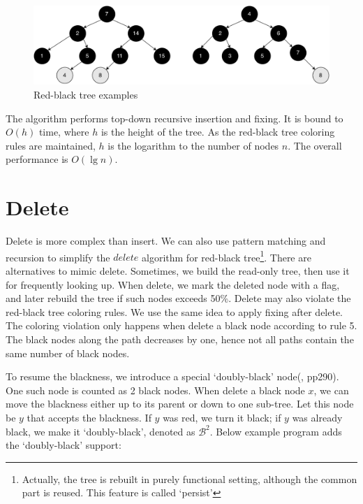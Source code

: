 \documentclass[b5paper]{article}
\begin{document}
\begin{figure}[htbp]
  \centering
  \includegraphics[scale=0.35]{img/insert-haskell}
  \caption{Red-black tree examples}
  \label{fig:insert-example}
\end{figure}

The algorithm performs top-down recursive insertion and fixing. It is bound to $O(h)$ time, where $h$ is the height of the tree. As the red-black tree coloring rules are maintained, $h$ is the logarithm to the number of nodes $n$. The overall performance is $O(\lg n)$.

\begin{Exercise}
\end{Exercise}

\section{Delete}

Delete is more complex than insert. We can also use pattern matching and recursion to simplify the $delete$ algorithm for red-black tree\footnote{Actually, the tree is rebuilt in purely functional setting, although the common part is reused. This feature is called `persist'}. There are alternatives to mimic delete. Sometimes, we build the read-only tree, then use it for frequently looking up\cite{okasaki-blog}. When delete, we mark the deleted node with a flag, and later rebuild the tree if such nodes exceeds 50\%. Delete may also violate the red-black tree coloring rules. We use the same idea to apply fixing after delete. The coloring violation only happens when delete a black node according to rule 5. The black nodes along the path decreases by one, hence not all paths contain the same number of black nodes.

To resume the blackness, we introduce a special `doubly-black' node(\cite{CLRS}, pp290). One such node is counted as 2 black nodes. When delete a black node $x$, we can move the blackness either up to its parent or down to one sub-tree. Let this node be $y$ that accepts the blackness. If $y$ was red, we turn it black; if $y$ was already black, we make it `doubly-black', denoted as $\mathcal{B}^2$. Below example program adds the `doubly-black' support:
\end{document}
